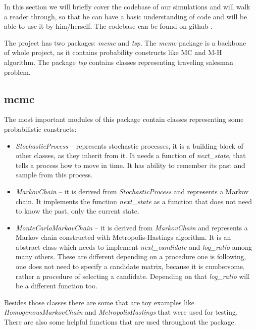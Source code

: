 In this section we will briefly cover the codebase of our simulations and will walk a reader through, so that he can have a basic understanding of code and will be able to use it by him/herself. The codebase can be found on github \cite{Homeomor72:online}. 

The project has two packages: \textit{mcmc} and \textit{tsp}. The \textit{mcmc} package is a backbone of whole project, as it contains probability constructs like MC and M-H algorithm. The package \textit{tsp} contains classes representing traveling salesman problem.

\subsection{mcmc}
	The most important modules of this package contain classes representing some probabilistic constructs:
	\begin{itemize}
		\item \textit{StochasticProcess} -- represents stochastic processes, it is a building block of other classes, as they inherit from it. It needs a function of \textit{next\_state}, that tells a process how to move in time. It has ability to remember its past and sample from this process.
		\item \textit{MarkovChain} -- it is derived from \textit{StochasticProcess} and represents a Markov chain. It implements the function \textit{next\_state} as a function that does not need to know the past, only the current state.
		\item \textit{MonteCarloMarkovChain} -- it is derived from \textit{MarkovChain} and represents a Markov chain constructed with Metropolis-Hastings algorithm. It is an abstract class which needs to implement \textit{next\_candidate} and \textit{log\_ratio} among many others. These are different depending on a procedure one is following, one does not need to specify a candidate matrix, because it is cumbersome, rather a procedure of selecting a candidate. Depending on that \textit{log\_ratio} will be a different function too.
	\end{itemize}

Besides those classes there are some that are toy examples like \textit{HomogenousMarkovChain} and \textit{MetropolisHastings} that were used for testing. There are also some helpful functions that are used throughout the package.

